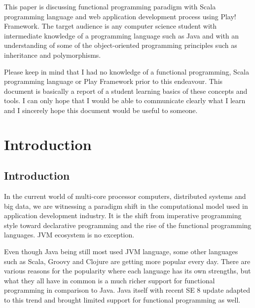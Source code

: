 \documentclass[12pt,twoside,a4paper]{report}
\begin{document}
This paper is discussing functional programming paradigm with Scala programming language and web application development process using Play! Framework. The target audience is any computer science student with intermediate knowledge of a programming language such as Java and with an understanding of some of the object-oriented programming principles such as inheritance and polymorphisms.

Please keep in mind that I had no knowledge of a functional programming, Scala programming language or Play Framework prior to this endeavour. This document is basically a report of a student learning basics of these concepts and tools. I can only hope that I would be able to communicate clearly what I learn and I sincerely hope this document would be useful to someone.

\listoffigures
\tableofcontents{}











\chapter{Introduction}\label{1}

\section{Introduction}\label{1.1}
In the current world of multi-core processor computers, distributed systems and big data, we are witnessing a paradigm shift in the computational model used in application development industry. It is the shift from imperative programming style toward declarative programming and the rise of the functional programming languages\cite{1}. JVM ecosystem is no exception.

Even though Java being still most used JVM language, some other languages such as Scala, Groovy and Clojure are getting more popular every day. There are various reasons for the popularity where each language has its own strengths, but what they all have in common is a much richer support for functional programming in comparison to Java. Java itself with recent SE 8 update adapted to this trend and brought limited support for functional programming as well.
\end{document}
